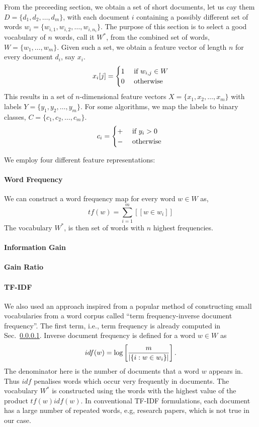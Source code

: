 \documentclass[11pt, letterpaper, conference, final, twocolumn]{ieeeconf}
\begin{document}
From the preceeding section, we obtain a set of short documents, let us cay them $D = \{d_1, d_2, \ldots, d_m\}$, with each document $i$ containing a possibly different set of words $w_{i} = \{w_{i,1}, w_{i, 2}, \ldots, w_{i, n_i} \}$. The purpose of this section is to select a good vocabulary of $n$ words, call it $W^*$, from the combined set of words, $W = \{w_1, \ldots, w_m\}$. Given such a set, we obtain a feature vector of length $n$ for every document $d_i$, say $x_i$.
$$
x_i[j] = \begin{cases}
	1 & \textrm{ if } w_{i,j} \in W \\
	0 & \textrm{ otherwise }
\end{cases}
$$
This results in a set of $n$-dimensional feature vectors $X = \{ x_1, x_2, \ldots, x_m \}$ with labels $Y = \{y_1, y_2, \ldots, y_m \}$. For some algorithms, we map the labels to binary classes, $C = \{c_1, c_2, \ldots, c_m \}$.
$$
c_i = \begin{cases}
	+ & \textrm{ if } y_i > 0 \\
	- & \textrm{ otherwise }
\end{cases}
$$

We employ four different feature representations:
\paragraph{Word Frequency}
\label{ssec:wf}
We can construct a word frequency map for every word $w \in W$ as,
$$
tf(w) = \sum_{i=1}^m [[ w \in w_i ]]
$$
The vocabulary $W^*$, is then set of words with $n$ highest frequencies.

\paragraph{Information Gain}
\label{ssec:ig}

\paragraph{Gain Ratio}
\label{ssec:gr}

\paragraph{TF-IDF}
\label{ssec:tfidf}
We also used an approach inspired from a popular method of constructing small vocabularies from a word corpus called ``term frequency-inverse document frequency''. The first term, i.e., term frequency is already computed in Sec.~\ref{ssec:wf}. Inverse document frequency is defined for a word $w \in W$ as
$$
idf(w) = \log \left[ \frac{m}{\left| \{i: w \in w_i \} \right|} \right].
$$
The denominator here is the number of documents that a word $w$ appears in. Thus $idf$ penalises words which occur very frequently in documents. The vocabulary $W^*$ is constructed using the words with the highest value of the product $tf(w) idf(w)$. In conventional TF-IDF formulations, each document has a large number of repeated words, e.g, research papers, which is not true in our case.
\end{document}
